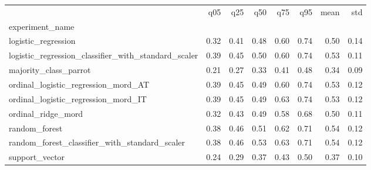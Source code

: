 \begin{tabular}{lrrrrrrr}
\toprule
 & q05 & q25 & q50 & q75 & q95 & mean & std \\
experiment_name &  &  &  &  &  &  &  \\
\midrule
logistic_regression & 0.32 & 0.41 & 0.48 & 0.60 & 0.74 & 0.50 & 0.14 \\
logistic_regression_classifier_with_standard_scaler & 0.39 & 0.45 & 0.50 & 0.60 & 0.74 & 0.53 & 0.11 \\
majority_class_parrot & 0.21 & 0.27 & 0.33 & 0.41 & 0.48 & 0.34 & 0.09 \\
ordinal_logistic_regression_mord_AT & 0.39 & 0.45 & 0.49 & 0.60 & 0.74 & 0.53 & 0.12 \\
ordinal_logistic_regression_mord_IT & 0.39 & 0.45 & 0.49 & 0.63 & 0.74 & 0.53 & 0.12 \\
ordinal_ridge_mord & 0.32 & 0.43 & 0.49 & 0.58 & 0.68 & 0.50 & 0.11 \\
random_forest & 0.38 & 0.46 & 0.51 & 0.62 & 0.71 & 0.54 & 0.12 \\
random_forest_classifier_with_standard_scaler & 0.38 & 0.46 & 0.53 & 0.63 & 0.71 & 0.54 & 0.12 \\
support_vector & 0.24 & 0.29 & 0.37 & 0.43 & 0.50 & 0.37 & 0.10 \\
\bottomrule
\end{tabular}
